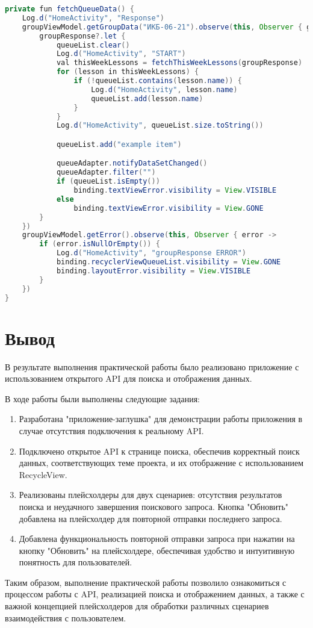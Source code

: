 \begin{lstlisting}[language=Java]
private fun fetchQueueData() {
	Log.d("HomeActivity", "Response")
	groupViewModel.getGroupData("ИКБ-06-21").observe(this, Observer { groupResponse ->
		groupResponse?.let {
			queueList.clear()
			Log.d("HomeActivity", "START")
			val thisWeekLessons = fetchThisWeekLessons(groupResponse)
			for (lesson in thisWeekLessons) {
				if (!queueList.contains(lesson.name)) {
					Log.d("HomeActivity", lesson.name)
					queueList.add(lesson.name)
				}
			}
			Log.d("HomeActivity", queueList.size.toString())

			queueList.add("example item")

			queueAdapter.notifyDataSetChanged()
			queueAdapter.filter("")
			if (queueList.isEmpty())
				binding.textViewError.visibility = View.VISIBLE
			else
				binding.textViewError.visibility = View.GONE
		}
	})
	groupViewModel.getError().observe(this, Observer { error ->
		if (error.isNullOrEmpty()) {
			Log.d("HomeActivity", "groupResponse ERROR")
			binding.recyclerViewQueueList.visibility = View.GONE
			binding.layoutError.visibility = View.VISIBLE
		}
	})
}
\end{lstlisting}

\clearpage

\section*{\LARGE Вывод}

В результате выполнения практической работы было реализовано приложение
с использованием открытого API для поиска и отображения данных. 

В ходе работы были выполнены следующие задания:

\begin{enumerate}
    \item Разработана "приложение-заглушка" для демонстрации работы
		приложения в случае отсутствия подключения к реальному API.
    \item Подключено открытое API к странице поиска,
		обеспечив корректный поиск данных, соответствующих теме проекта,
		и их отображение с использованием RecycleView.
    \item Реализованы плейсхолдеры для двух сценариев:
		отсутствия результатов поиска и неудачного завершения поискового
		запроса. Кнопка "Обновить" добавлена на плейсхолдер
		для повторной отправки последнего запроса.
    \item Добавлена функциональность повторной отправки запроса
		при нажатии на кнопку "Обновить" на плейсхолдере,
		обеспечивая удобство и интуитивную понятность для пользователей.
\end{enumerate}

Таким образом, выполнение практической работы позволило ознакомиться
с процессом работы с API, реализацией поиска и отображением данных,
а также с важной концепцией плейсхолдеров для обработки различных сценариев
взаимодействия с пользователем.

